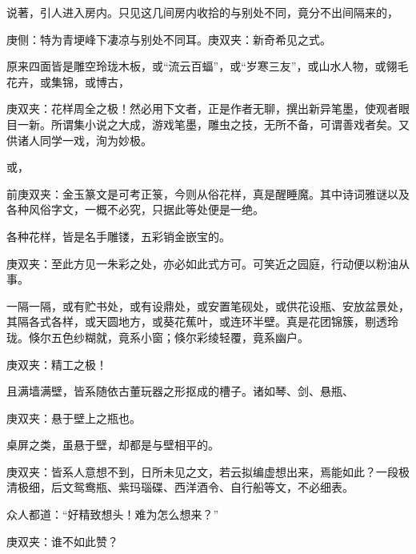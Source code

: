 \begin{parag}
    说著，引人进入房内。只见这几间房内收拾的与别处不同，竟分不出间隔来的，\begin{note}庚侧：特为青埂峰下凄凉与别处不同耳。庚双夹：新奇希见之式。\end{note}原来四面皆是雕空玲珑木板，或“流云百蝠”，或“岁寒三友”，或山水人物，或翎毛花卉，或集锦，或博古，\begin{note}庚双夹：花样周全之极！然必用下文者，正是作者无聊，撰出新异笔墨，使观者眼目一新。所谓集小说之大成，游戏笔墨，雕虫之技，无所不备，可谓善戏者矣。又供诸人同学一戏，洵为妙极。\end{note}或，\begin{note}前庚双夹：金玉篆文是可考正箓，今则从俗花样，真是醒睡魔。其中诗词雅谜以及各种风俗字文，一概不必究，只据此等处便是一绝。\end{note}各种花样，皆是名手雕镂，五彩销金嵌宝的。\begin{note}庚双夹：至此方见一朱彩之处，亦必如此式方可。可笑近之园庭，行动便以粉油从事。\end{note}一隔一隔，或有贮书处，或有设鼎处，或安置笔砚处，或供花设瓶、安放盆景处，其隔各式各样，或天圆地方，或葵花蕉叶，或连环半壁。真是花团锦簇，剔透玲珑。倏尔五色纱糊就，竟系小窗；倏尔彩绫轻覆，竟系幽户。\begin{note}庚双夹：精工之极！\end{note}且满墙满壁，皆系随依古董玩器之形抠成的槽子。诸如琴、剑、悬瓶、\begin{note}庚双夹：悬于壁上之瓶也。\end{note}桌屏之类，虽悬于壁，却都是与壁相平的。\begin{note}庚双夹：皆系人意想不到，日所未见之文，若云拟编虚想出来，焉能如此？一段极清极细，后文鸳鸯瓶、紫玛瑙碟、西洋酒令、自行船等文，不必细表。\end{note}众人都道：“好精致想头！难为怎么想来？”\begin{note}庚双夹：谁不如此赞？\end{note}
\end{parag}



